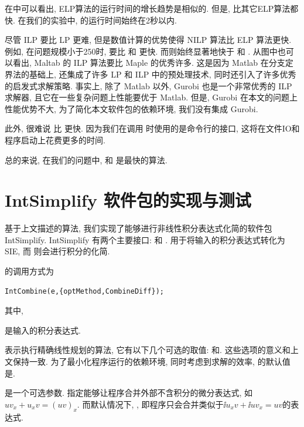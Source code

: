 在中可以看出, ELP算法的运行时间的增长趋势是相似的. 但是, 比其它ELP算法都快. 在我们的实验中, 的运行时间始终在2秒以内. 

尽管 ILP 要比 LP 更难, 但是数值计算的优势使得 NILP 算法比 ELP 算法更快. 例如, 在问题规模小于250时,  要比  和 更快. 而则始终显著地快于 和 . 从图中也可以看出, Maltab 的 ILP 算法要比 Maple 的优秀许多. 这是因为 Matlab 在分支定界法\cite{wolsey1998integer}的基础上, 还集成了许多 LP 和 ILP 中的预处理技术\cite{preLP1995,preLP2003,preMILP1994,cut2008}, 同时还引入了许多优秀的启发式求解策略\cite{Heuristics2005,berthold2006primal}. 事实上, 除了 Matlab 以外, Gurobi 也是一个非常优秀的 ILP 求解器, 且它在一些复杂问题上性能要优于 Matlab. 但是, Gurobi 在本文的问题上性能优势不大, 为了简化本文软件包的依赖环境, 我们没有集成 Gurobi. 

此外, 很难说  比  更快. 因为我们在调用 时使用的是命令行的接口, 这将在文件IO和程序启动上花费更多的时间.

总的来说, 在我们的问题中,  和  是最快的算法. 

\section{IntSimplify 软件包的实现与测试}\label{Results-03}
基于上文描述的算法, 我们实现了能够进行非线性积分表达式化简的软件包 IntSimplify. IntSimplify 有两个主要接口:  和 .  用于将输入的积分表达式转化为SIE, 而 则会进行积分的化简.

的调用方式为
\begin{verbatim}
IntCombine(e,{optMethod,CombineDiff});
\end{verbatim}
其中, 
\begin{compactitem}[\textbullet]
\item {}是输入的积分表达式.
\item {}表示执行精确线性规划的算法, 它有以下几个可选的取值: 和. 这些选项的意义和上文保持一致. 为了最小化程序运行的依赖环境, 同时考虑到求解的效率, 的默认值是. 
\item {}是一个可选参数. 指定能够让程序合并外部不含积分的微分表达式, 如$uv_x+u_xv=(uv)_x$. 而默认情况下, , 即程序只会合并类似于$\ii{u_xv}+\ii{uv_x}=uv$的表达式. 
\end{compactitem}

